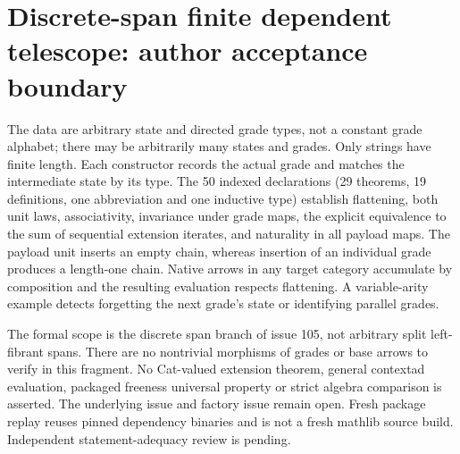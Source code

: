 \documentclass{article}
\begin{document}
\section*{Discrete-span finite dependent telescope: author acceptance boundary}
The data are arbitrary state and directed grade types, not a constant grade alphabet; there may be arbitrarily many states and grades. Only strings have finite length. Each constructor records the actual grade and matches the intermediate state by its type. The 50 indexed declarations (29 theorems, 19 definitions, one abbreviation and one inductive type) establish flattening, both unit laws, associativity, invariance under grade maps, the explicit equivalence to the sum of sequential extension iterates, and naturality in all payload maps. The payload unit inserts an empty chain, whereas insertion of an individual grade produces a length-one chain. Native arrows in any target category accumulate by composition and the resulting evaluation respects flattening. A variable-arity example detects forgetting the next grade's state or identifying parallel grades.

The formal scope is the discrete span branch of issue 105, not arbitrary split left-fibrant spans. There are no nontrivial morphisms of grades or base arrows to verify in this fragment. No Cat-valued extension theorem, general contextad evaluation, packaged freeness universal property or strict algebra comparison is asserted. The underlying issue and factory issue remain open. Fresh package replay reuses pinned dependency binaries and is not a fresh mathlib source build. Independent statement-adequacy review is pending.
\end{document}

